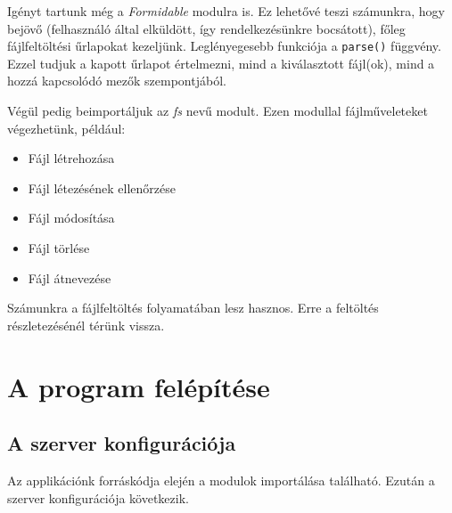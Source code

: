Igényt tartunk még a \textit{Formidable} modulra is. Ez lehetővé teszi számunkra, hogy bejövő (felhasználó által elküldött, így rendelkezésünkre bocsátott), főleg fájlfeltöltési űrlapokat kezeljünk. Leglényegesebb funkciója a \texttt{parse()} függvény. Ezzel tudjuk a kapott űrlapot értelmezni, mind a kiválasztott fájl(ok), mind a hozzá kapcsolódó mezők szempontjából.

Végül pedig beimportáljuk az \textit{fs} nevű modult. Ezen modullal fájlműveleteket végezhetünk, például:
\begin{itemize}
\item{Fájl létrehozása}
\item{Fájl létezésének ellenőrzése}
\item{Fájl módosítása}
\item{Fájl törlése}
\item{Fájl átnevezése}
\end{itemize}
Számunkra a fájlfeltöltés folyamatában lesz hasznos. Erre a feltöltés részletezésénél térünk vissza.


\section{A program felépítése}


\subsection{A szerver konfigurációja}

Az applikációnk forráskódja elején a modulok importálása található. Ezután a szerver konfigurációja következik.

